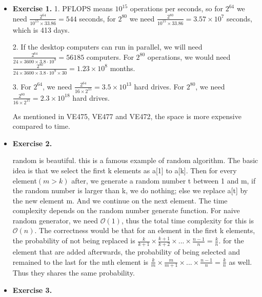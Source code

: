 \documentclass{article}
\newcommand{\bigO}{\mathcal{O}}
\begin{document}
\noindent

\noindent{}

\begin{itemize}

\item \textbf{Exercise 1.}
1. PFLOPS means $10^15$ operations per seconds, so for $2^{64}$ we need $\frac{2^{64}}{10^{15}\times 33.86} = 544$ seconds, for $2^{80}$ we need $\frac{2^{80}}{10^{15}\times 33.86} = 3.57\times 10^7$ seconds, which is 413 days.

2. If the desktop computers can run in parallel, we will need $\frac{2^{64}}{24\times 3600 \times 3.8\cdot 10^9} = 56185$ computers. For $2^{80}$ operations, we would need $\frac{2^{80}}{24\times 3600 \times 3.8\cdot 10^9 \times 30} = 1.23\times 10^8$ months.

3. For $2^{64}$, we need $\frac{2^{64}}{16\times 2^15} = 3.5\times 10^{13}$ hard drives. For $2^{80}$, we need $\frac{2^{80}}{16\times 2^15} = 2.3\times 10^{18}$ hard drives. 

As mentioned in VE475, VE477 and VE472, the space is more expensive compared to time. 

\item \textbf{Exercise 2.}

random is beautiful. this is a famous example of random algorithm. The basic idea is that we select the first k elements as a[1] to a[k]. Then for every element$(m > k)$ after, we generate a random number t between 1 and m, if the random number is larger than k, we do nothing; else we replace a[t] by the new element m. And we continue on the next element. The time complexity depends on the random number generate function. For naive random generator, we need $\bigO (1)$, thus the total time complexity for this is $\bigO (n)$. The correctness would be that for an element in the first k elements, the probability of not being replaced is $\frac{k}{k+1}\times \frac{k+1}{k+2}\times ... \times \frac{n-1}{n} = \frac{k}{n}$. for the element that are added afterwards, the probability of being selected and remained to the last for the mth element is $\frac{k}{m}\times \frac{m}{m+1}\times ... \times \frac{n-1}{n} = \frac{k}{n}$ as well. Thus they shares the same probability.

\item \textbf{Exercise 3.}


\end{itemize}
\end{document}

